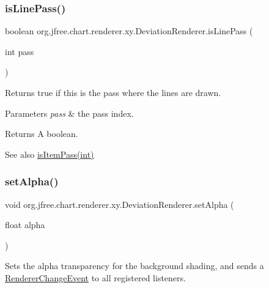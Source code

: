 \subsubsection{\texorpdfstring{is\+Line\+Pass()}{isLinePass()}}
{\footnotesize\ttfamily boolean org.\+jfree.\+chart.\+renderer.\+xy.\+Deviation\+Renderer.\+is\+Line\+Pass (\begin{DoxyParamCaption}\item[{int}]{pass }\end{DoxyParamCaption})\hspace{0.3cm}{\ttfamily [protected]}}

Returns {\ttfamily true} if this is the pass where the lines are drawn.


\begin{DoxyParams}{Parameters}
{\em pass} & the pass index.\\
\hline
\end{DoxyParams}
\begin{DoxyReturn}{Returns}
A boolean.
\end{DoxyReturn}
\begin{DoxySeeAlso}{See also}
\mbox{\hyperlink{classorg_1_1jfree_1_1chart_1_1renderer_1_1xy_1_1_deviation_renderer_afc3467f976aacc73e730ebeedf5ea704}{is\+Item\+Pass(int)}} 
\end{DoxySeeAlso}
\mbox{\label{classorg_1_1jfree_1_1chart_1_1renderer_1_1xy_1_1_deviation_renderer_a4cb9b69ec80e4f75dfcd78faf571479d}} 
\subsubsection{\texorpdfstring{set\+Alpha()}{setAlpha()}}
{\footnotesize\ttfamily void org.\+jfree.\+chart.\+renderer.\+xy.\+Deviation\+Renderer.\+set\+Alpha (\begin{DoxyParamCaption}\item[{float}]{alpha }\end{DoxyParamCaption})}

Sets the alpha transparency for the background shading, and sends a \mbox{\hyperlink{}{Renderer\+Change\+Event}} to all registered listeners.


